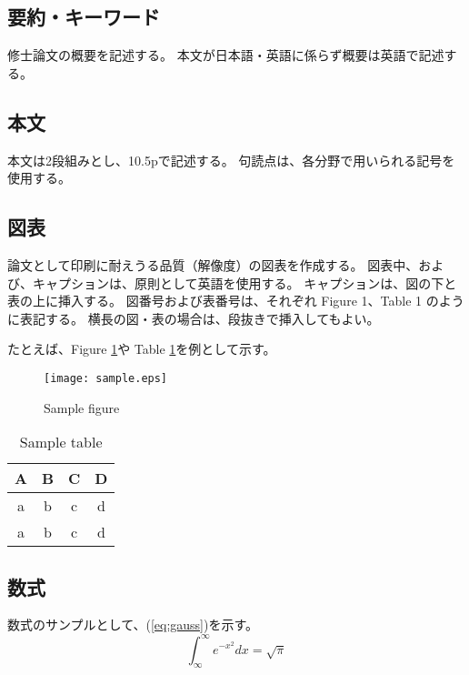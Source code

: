 \documentclass[11pt,twocolumn]{jarticle} %
\begin{document}
\subsection{要約・キーワード}
修士論文の概要を記述する。
本文が日本語・英語に係らず概要は英語で記述する。


\subsection{本文}
本文は2段組みとし、10.5pで記述する。
句読点は、各分野で用いられる記号を使用する。

\subsection{図表}
論文として印刷に耐えうる品質（解像度）の図表を作成する。
図表中、および、キャプションは、原則として英語を使用する。
キャプションは、図の下と表の上に挿入する。
図番号および表番号は、それぞれ Figure 1、Table 1 のように表記する。
横長の図・表の場合は、段抜きで挿入してもよい。

たとえば、Figure \ref{fig:samplefigure}や Table \ref{tbl:sampletable}を例として示す。

\begin{figure}[t]
 \begin{center}
  \texttt{[image: sample.eps]}
  \caption{Sample figure}\label{fig:samplefigure}
 \end{center}
\end{figure}

\begin{table}
 \caption{Sample table} \label{tbl:sampletable}
\begin{center}
  \begin{tabular}{c|ccc}
  A & B & C & D\\
  \hline \hline
  a & b & c & d\\
  a & b & c & d\\ \hline
 \end{tabular}
\end{center}
\end{table}

\subsection{数式}
数式のサンプルとして、(\ref{eq:gauss})を示す。
\begin{equation}
 \int _\infty ^\infty e^{-x^2}dx = \sqrt{\pi} \label{eq:gauss}
\end{equation}
\end{document}
